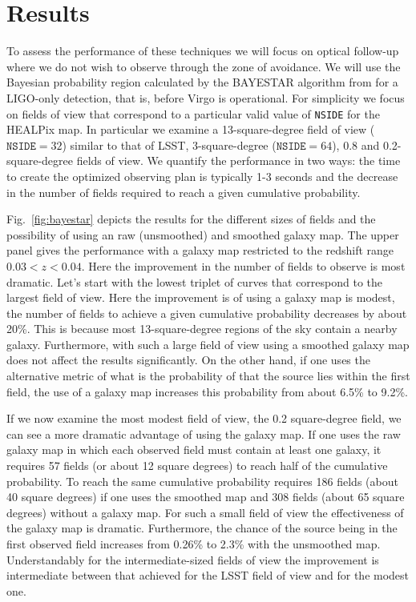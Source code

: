 \documentclass[useAMS,usenatbib]{mn2e}
\begin{document}
\section{Results}

To assess the performance of these techniques we will focus on optical
follow-up where we do not wish to observe through the zone of
avoidance.  We will use the Bayesian probability region calculated by
the BAYESTAR algorithm \citep{2015arXiv150803634S} from
\citet{2014ApJ...795..105S} for a LIGO-only detection, that is, before
Virgo is operational.  For simplicity we focus on fields of view that
correspond to a particular valid value of \texttt{NSIDE} for the
HEALPix map.  In particular we examine a 13-square-degree field of
view ($\mathtt{NSIDE}=32$) similar to that of LSST, 3-square-degree
($\mathtt{NSIDE}=64$), 0.8 and 0.2-square-degree fields of view.  We
quantify the performance in two ways: the time to create the optimized
observing plan is typically 1-3 seconds and the decrease in the number
of fields required to reach a given cumulative probability.

Fig.~\ref{fig:bayestar} depicts the results for the different sizes of
fields and the possibility of using an raw (unsmoothed) and smoothed
galaxy map.  The upper panel gives the performance with a galaxy map
restricted to the redshift range $0.03<z<0.04$.  Here the improvement
in the number of fields to observe is most dramatic.  Let's start with
the lowest triplet of curves that correspond to the largest field of
view.  Here the improvement is of using a galaxy map is modest, the
number of fields to achieve a given cumulative probability decreases
by about 20\%.  This is because most 13-square-degree regions of the
sky contain a nearby galaxy. Furthermore, with such a large field of
view using a smoothed galaxy map does not affect the results
significantly.  On the other hand, if one uses the alternative metric
of what is the probability of that the source lies within the first
field, the use of a galaxy map increases this probability from about
6.5\% to 9.2\%.

If we now examine the most modest field of view, the 0.2 square-degree
field, we can see a more dramatic advantage of using the galaxy map.
If one uses the raw galaxy map in which each observed field must
contain at least one galaxy, it requires 57 fields (or about 12 square
degrees) to reach half of the cumulative probability.  To reach the
same cumulative probability requires 186 fields (about 40 square
degrees) if one uses the smoothed map and 308 fields (about 65 square
degrees) without a galaxy map.  For such a small field of view the
effectiveness of the galaxy map is dramatic.  Furthermore, the chance
of the source being in the first observed field increases from 0.26\%
to 2.3\% with the unsmoothed map.  Understandably for the
intermediate-sized fields of view the improvement is intermediate
between that achieved for the LSST field of view and for the modest one.
\end{document}
